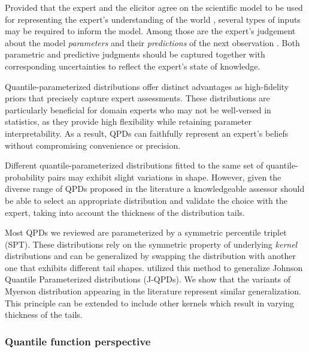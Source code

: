 \documentclass[
  fleqn,
  deca,
  blindrev
]{informs4}
\begin{document}
Provided that the expert and the elicitor agree on the scientific model
to be used for representing the expert's understanding of the world
\citep{burgman2021ElicitingModelStructures}, several types of inputs may
be required to inform the model. Among those are the expert's judgement
about the model \emph{parameters}
\citep{mikkola2021PriorKnowledgeElicitation, ohagan2019ExpertKnowledgeElicitation}
and their \emph{predictions} of the next observation
\citep{akbarov2009ProbabilityElicitationPredictive, kadane1998ExperiencesElicitation, winkler1980PriorInformationPredictive}.
Both parametric and predictive judgments should be captured together
with corresponding uncertainties to reflect the expert's state of
knowledge.

Quantile-parameterized distributions offer distinct advantages as
high-fidelity priors that precisely capture expert assessments. These
distributions are particularly beneficial for domain experts who may not
be well-versed in statistics, as they provide high flexibility while
retaining parameter interpretability. As a result, QPDs can faithfully
represent an expert's beliefs without compromising convenience or
precision.

Different quantile-parameterized distributions fitted to the same set of
quantile-probability pairs may exhibit slight variations in shape.
However, given the diverse range of QPDs proposed in the literature a
knowledgeable assessor should be able to select an appropriate
distribution and validate the choice with the expert, taking into
account the thickness of the distribution tails.

Most QPDs we reviewed are parameterized by a symmetric percentile
triplet (SPT). These distributions rely on the symmetric property of
underlying \emph{kernel} distributions and can be generalized by
swapping the distribution with another one that exhibits different tail
shapes. \citet{hadlock2019GeneralizedJohnsonQuantileParameterized}
utilized this method to generalize Johnson Quantile Parameterized
distributions (J-QPDs). We show that the variants of Myerson
distribution appearing in the literature
\citep{myerson2005ProbabilityModelsEconomic, wilson2023ReconciliationExpertPriors}
represent similar generalization. This principle can be extended to
include other kernels which result in varying thickness of the tails.

\subsubsection*{Quantile function
perspective}\label{quantile-function-perspective}
\end{document}

